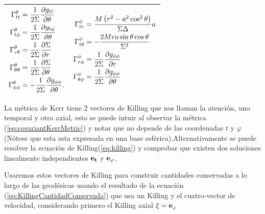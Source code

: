 \begin{table}
\begin{small}
\begin{center}
\begin{tabular}[c]{l|l}
                \hline
                $\begin{aligned} \Gamma_{t t}^\theta & =\frac{1}{2 \Sigma} \frac{\partial g_{t t}}{\partial \theta} \\ \Gamma_{t \phi}^\theta & =\frac{1}{2 \Sigma} \frac{\partial g_{t \phi}}{\partial \theta} \\ \Gamma_{r \theta}^\theta & =\frac{1}{2 \Sigma} \frac{\partial \Sigma}{\partial r} \\ \Gamma_{\theta \theta}^\theta & =\frac{1}{2 \Sigma} \frac{\partial \Sigma}{\partial \theta} \\ \Gamma_{\phi \phi}^\theta & =-\frac{1}{2 \Sigma} \frac{\partial g_{\phi \phi}}{\partial \theta} .\end{aligned}$ & $\begin{aligned} \Gamma_{t r}^\phi & =\frac{M\left(r^2-a^2 \cos ^2 \theta\right)}{\Sigma \Delta} a \\ \Gamma_{t \theta}^\phi & =-\frac{2 M r a \sin \theta \cos \theta}{\Sigma^2} \\ \Gamma_{r \phi}^\phi & =\frac{1}{2 \Sigma} \frac{\partial g_{\phi \phi}}{\partial r} \\ \Gamma_{\theta \phi}^\phi & =\frac{1}{2 \Sigma} \frac{\partial g_{\phi \phi}}{\partial \theta}\end{aligned}$                                                                                                   \\
                \hline
            \end{tabular}
        \end{center}
    \end{small}
\end{table}



La métrica de Kerr tiene 2 vectores de Killing que nos llaman la atención, uno temporal y otro axial, esto se puede intuir al observar la métrica (\ref{eq:covariantKerrMetric}) y notar que no depende de las coordenadas $t$ y $\varphi$ (Nótese que esta esta expresada en una base esférica).Alternativamente se puede resolver la ecuación de Killing(\ref{eq:killing}) y comprobar que existen dos soluciones linealmente independientes $\mathbf{e_t}$ y $\mathbf{e_\varphi}$.

Usaremos estos vectores de Killing para construir cantidades conservadas a lo largo de las geodésicas usando el resultado de la ecuación (\ref{eq:KillingCantidadConservada}) que usa un Killing y el cuatro-vector de velocidad, considerando primero el Killing axial $\mathbf{\xi}=\mathbf{e_\varphi}$

